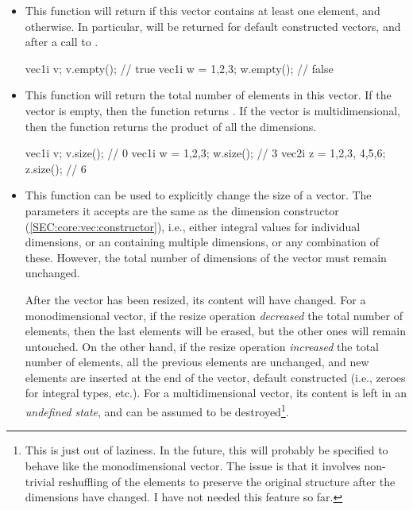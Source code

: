 \documentclass[12pt]{report}
\newenvironment{example}
{
    \begin{mdframed}[style=example,frametitle={Example}]
}
{
    \end{mdframed}
}
\begin{document}
\begin{itemize}
\item {}

This function will return  if this vector contains at least one element, and  otherwise. In particular,  will be returned for default constructed vectors, and after a call to .

\begin{example}
\begin{cppcode}
vec1i v;
v.empty(); // true
vec1i w = {1,2,3};
w.empty(); // false
\end{cppcode}
\end{example}

\item {}

This function will return the total number of elements in this vector. If the vector is empty, then the function returns . If the vector is multidimensional, then the function returns the product of all the dimensions.

\begin{example}
\begin{cppcode}
vec1i v;
v.size(); // 0
vec1i w = {1,2,3};
w.size(); // 3
vec2i z = {{1,2,3}, {4,5,6}};
z.size(); // 6
\end{cppcode}
\end{example}

\item {}

This function can be used to explicitly change the size of a vector. The parameters it accepts are the same as the dimension constructor (\ref{SEC:core:vec:constructor}), i.e., either integral values for individual dimensions, or an  containing multiple dimensions, or any combination of these. However, the total number of dimensions of the vector must remain unchanged.

After the vector has been resized, its content will have changed. For a monodimensional vector, if the resize operation \emph{decreased} the total number of elements, then the last elements will be erased, but the other ones will remain untouched. On the other hand, if the resize operation \emph{increased} the total number of elements, all the previous elements are unchanged, and new elements are inserted at the end of the vector, default constructed (i.e., zeroes for integral types, etc.). For a multidimensional vector, its content is left in an \emph{undefined state}, and can be assumed to be destroyed\footnote{This is just out of laziness. In the future, this will probably be specified to behave like the monodimensional vector. The issue is that it involves non-trivial reshuffling of the elements to preserve the original structure after the dimensions have changed. I have not needed this feature so far.}.


\end{itemize}
\end{document}
